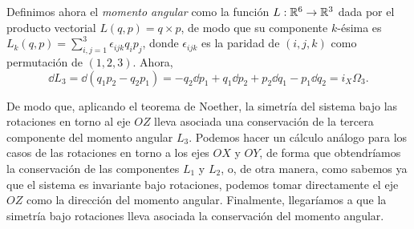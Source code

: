 \begin{ejemplo}
    Definimos ahora el \emph{momento angular} como la función $L:\mathbb{R}^6 \rightarrow \mathbb{R}^3$ dada por el producto vectorial $L(q,p)=q\times p$, de modo que su componente $k$-ésima es $L_k(q,p)=\sum_{i,j=1}^3 \epsilon_{ijk}q_ip_j$, donde $\epsilon_{ijk}$ es la paridad de $(i,j,k)$ como permutación de $(1,2,3)$. Ahora, 
    \begin{equation*}
      \dd L_3 = \dd (q_1p_2 - q_2p_1)=-q_2 \dd p_1 + q_1 \dd p_2 + p_2 \dd q_1 - p_1 \dd q_2 = i_X\Omega_3.
    \end{equation*}

    De modo que, aplicando el teorema de Noether, la simetría del sistema bajo las rotaciones en torno al eje $OZ$ lleva asociada una conservación de la tercera componente del momento angular $L_3$. Podemos hacer un cálculo análogo para los casos de las rotaciones en torno a los ejes $OX$ y $OY$, de forma que obtendríamos la conservación de las componentes $L_1$ y $L_2$, o, de otra manera, como sabemos ya que el sistema es invariante bajo rotaciones, podemos tomar directamente el eje $OZ$ como la dirección del momento angular. Finalmente, llegaríamos a que la simetría bajo rotaciones lleva asociada la conservación del momento angular.
\end{ejemplo}
